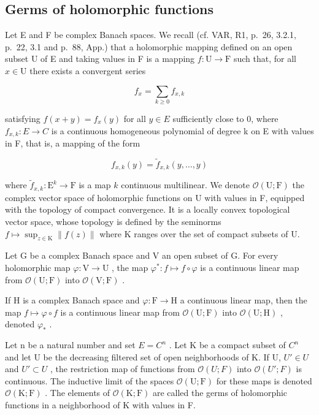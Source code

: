 \subsection{Germs of holomorphic functions}

Let E and F be complex Banach spaces. We recall (cf. VAR, R1, p.~26, 3.2.1, p.~22, 3.1 and p.~88, App.) that a holomorphic mapping defined on an open subset U of E and taking values in F is a mapping \(f \colon \mathrm{U} \to \mathrm{F}\) such that, for all \(x \in \mathrm{U}\) there exists a convergent series

\[
f _ {x} = \sum_ {k \geqslant 0} f _ {x, k}
\]

satisfying \(f(x + y) = f_x(y)\) for all \(y \in E\) sufficiently close to 0, where \(f_{x,k} \colon E \to C\) is a continuous homogeneous polynomial of degree k on E with values in F, that is, a mapping of the form

\[
f _ {x, k} (y) = \widetilde {f} _ {x, k} (y, \ldots , y)
\]

where \(\widetilde{f}_{x,k}\colon\mathrm{E}^{k}\to\mathrm{F}\) is a map \(k\) continuous multilinear. We denote \(\mathcal{O}(\mathrm{U};\mathrm{F})\) the complex vector space of holomorphic functions on U with values in F, equipped with the topology of compact convergence. It is a locally convex topological vector space, whose topology is defined by the seminorms \(f\mapsto\sup_{z\in\mathrm{K}}\|f(z)\|\) where K ranges over the set of compact subsets of U.

Let G be a complex Banach space and V an open subset of G. For every holomorphic map \(\varphi\colon\mathrm{V}\to\mathrm{U}\) , the map \(\varphi^{*}\colon f\mapsto f\circ\varphi\) is a continuous linear map from \(\mathcal{O}(\mathrm{U};\mathrm{F})\) into \(\mathcal{O}(\mathrm{V};\mathrm{F})\) .

If H is a complex Banach space and \(\varphi\colon\mathrm{F}\to\mathrm{H}\) a continuous linear map, then the map \(f\mapsto\varphi\circ f\) is a continuous linear map from \(\mathcal{O}(\mathrm{U};\mathrm{F})\) into \(\mathcal{O}(\mathrm{U};\mathrm{H})\) , denoted \(\varphi_{*}\) .

Let n be a natural number and set \(E = C^{n}\) . Let K be a compact subset of \(C^{n}\) and let U be the decreasing filtered set of open neighborhoods of K. If U, \(U' \in U\) and \(U' \subset U\) , the restriction map of functions from \(\mathcal{O}(U; F)\) into \(\mathcal{O}(U'; F)\) is continuous. The inductive limit of the spaces \(\mathcal{O}(\mathrm{U};\mathrm{F})\) for these maps is denoted \(\mathcal{O}(\mathrm{K};\mathrm{F})\) . The elements of \(\mathcal{O}(\mathrm{K};\mathrm{F})\) are called the germs of holomorphic functions in a neighborhood of K with values in F.

